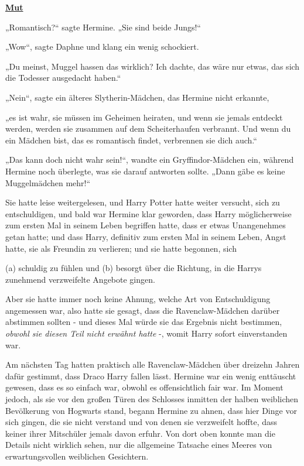 

\hypertarget{mut}{%

\textbf{\uline{Mut}}

„Romantisch?“ sagte Hermine. „Sie sind beide Jungs!“

„Wow“, sagte Daphne und klang ein wenig schockiert.

„Du meinst, Muggel hassen das wirklich? Ich dachte, das wäre nur etwas, das sich die Todesser ausgedacht haben.“

„Nein“, sagte ein älteres Slytherin-Mädchen, das Hermine nicht erkannte,

„es ist wahr, sie müssen im Geheimen heiraten, und wenn sie jemals entdeckt werden, werden sie zusammen auf dem Scheiterhaufen verbrannt. Und wenn du ein Mädchen bist, das es romantisch findet, verbrennen sie dich auch.“

„Das kann doch nicht wahr sein!“, wandte ein Gryffindor-Mädchen ein, während Hermine noch überlegte, was sie darauf antworten sollte. „Dann gäbe es keine Muggelmädchen mehr!“

Sie hatte leise weitergelesen, und Harry Potter hatte weiter versucht, sich zu entschuldigen, und bald war Hermine klar geworden, dass Harry möglicherweise zum ersten Mal in seinem Leben begriffen hatte, dass er etwas Unangenehmes getan hatte; und dass Harry, definitiv zum ersten Mal in seinem Leben, Angst hatte, sie als Freundin zu verlieren; und sie hatte begonnen, sich

(a) schuldig zu fühlen und (b) besorgt über die Richtung, in die Harrys zunehmend verzweifelte Angebote gingen.

Aber sie hatte immer noch keine Ahnung, welche Art von Entschuldigung angemessen war, also hatte sie gesagt, dass die Ravenclaw-Mädchen darüber abstimmen sollten - und dieses Mal würde sie das Ergebnis nicht bestimmen, \emph{obwohl sie diesen Teil nicht erwähnt hatte} -, womit Harry sofort einverstanden war.

Am nächsten Tag hatten praktisch alle Ravenclaw-Mädchen über dreizehn Jahren dafür gestimmt, dass Draco Harry fallen lässt. Hermine war ein wenig enttäuscht gewesen, dass es so einfach war, obwohl es offensichtlich fair war. Im Moment jedoch, als sie vor den großen Türen des Schlosses inmitten der halben weiblichen Bevölkerung von Hogwarts stand, begann Hermine zu ahnen, dass hier Dinge vor sich gingen, die sie nicht verstand und von denen sie verzweifelt hoffte, dass keiner ihrer Mitschüler jemals davon erfuhr. Von dort oben konnte man die Details nicht wirklich sehen, nur die allgemeine Tatsache eines Meeres von erwartungsvollen weiblichen Gesichtern.

}
